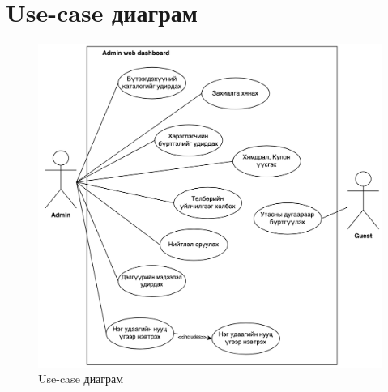 \section{Use-case диаграм}
\begin{figure}[h]
	\centering
	\includegraphics[scale=0.35]{src/images/usecase.png}
	\caption{Use-case диаграм}
\end{figure}
